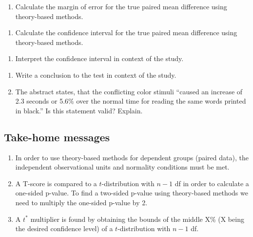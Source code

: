 \documentclass[
]{report}
\providecommand{\tightlist}{%
  \setlength{\itemsep}{0pt}\setlength{\parskip}{0pt}}
\begin{document}
\begin{enumerate}
\def\labelenumi{\arabic{enumi}.}
\setcounter{enumi}{10}
\tightlist
\item
  Calculate the margin of error for the true paired mean difference using theory-based methods.
\end{enumerate}

\vspace{0.6in}

\begin{enumerate}
\def\labelenumi{\arabic{enumi}.}
\setcounter{enumi}{11}
\tightlist
\item
  Calculate the confidence interval for the true paired mean difference using theory-based methods.
\end{enumerate}

\vspace{0.6in}

\begin{enumerate}
\def\labelenumi{\arabic{enumi}.}
\setcounter{enumi}{12}
\tightlist
\item
  Interpret the confidence interval in context of the study.
\end{enumerate}

\vspace{1in}

\begin{enumerate}
\def\labelenumi{\arabic{enumi}.}
\setcounter{enumi}{13}
\item
  Write a conclusion to the test in context of the study.
  \vspace{0.6in}
\item
  The abstract states, that the conflicting color stimuli ``caused an increase of 2.3 seconds or 5.6\% over the normal time for reading the same words printed in black.'' Is this statement valid? Explain.
  \vspace{0.6in}
\end{enumerate}

\subsection{Take-home messages}\label{take-home-messages-21}

\begin{enumerate}
\def\labelenumi{\arabic{enumi}.}
\item
  In order to use theory-based methods for dependent groups (paired data), the independent observational units and normality conditions must be met.
\item
  A T-score is compared to a \(t\)-distribution with \(n - 1\) df in order to calculate a one-sided p-value. To find a two-sided p-value using theory-based methods we need to multiply the one-sided p-value by 2.
\item
  A \(t^*\) multiplier is found by obtaining the bounds of the middle X\% (X being the desired confidence level) of a \(t\)-distribution with \(n - 1\) df.
\end{enumerate}
\end{document}
